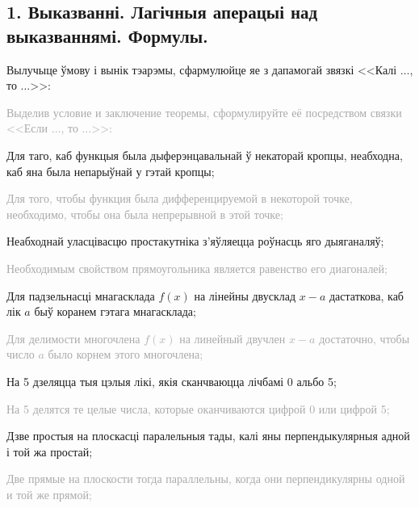 \documentclass[12pt,twoside]{article}
\newcommand{\ruText}[1]{{\scriptsize \textcolor{darkgray}{#1} \par}}
\renewenvironment{itemize}
{\begin{list}
             {\labelitemi}%
             {\setlength{\labelwidth}{1.3em}%
              \setlength{\labelsep}{0.7em}%
              \setlength{\itemindent}{0em}%
              \setlength{\listparindent}{3em}%
              \setlength{\leftmargin}{2em}%
              \setlength{\rightmargin}{0em}%
              \setlength{\parsep}{0ex}%
              \setlength{\topsep}{0.5ex}%
              \setlength{\itemsep}{1ex}%
             }%
}
{\end{list}}%
\begin{document}
\pagestyle{empty}

\subsection*{
  {\normalsize 1. Выказванні. Лагічныя аперацыі над выказваннямі. Формулы.} \\
  \indent \ruText{ Высказывания. Логические операции над высказываниями. Формулы.}
}

\begin{itemize}

\item[1.]

Вылучыце ўмову і вынік тэарэмы, сфармулюйце яе з дапамогай звязкі <<Калі $\ldots$, то $\ldots$>>: \\
\ruText{ Выделив условие и заключение теоремы, сформулируйте её посредством связки <<Если $\ldots$, то $\ldots$>>: }
\begin{itemize}

\item[(а)] Для таго, каб функцыя была дыферэнцавальнай ў некаторай кропцы, неабходна, каб яна была непарыўнай у гэтай кропцы; \\
\ruText{ Для того, чтобы функция была дифференцируемой в некоторой точке, необходимо, чтобы она была непрерывной в этой точке; }

\item[(б)] Неабходнай уласцівасцю простакутніка з'яўляецца роўнасць яго дыяганаляў; \\
\ruText{ Необходимым свойством прямоугольника является равенство его диагоналей; }

\item[(в)] Для падзельнасці мнагасклада $f(x)$ на лінейны двусклад $x - a$ дастаткова, каб лік $a$ быў коранем гэтага мнагасклада; \\
\ruText{ Для делимости многочлена $f(x)$ на линейный двучлен $x - a$ достаточно, чтобы число $a$ было корнем этого многочлена; }

\item[(г)] На 5 дзеляцца тыя цэлыя лікі, якія сканчваюцца лічбамі 0 альбо 5; \\
\ruText{ На 5 делятся те целые числа, которые оканчиваются цифрой 0 или цифрой 5; }

\item[(д)] Дзве простыя на плоскасці паралельныя тады, калі яны перпендыкулярныя адной і той жа простай; \\
\ruText{ Две прямые на плоскости тогда параллельны, когда они перпендикулярны одной и той же прямой; }


\end{itemize}
\end{itemize}
\end{document}

